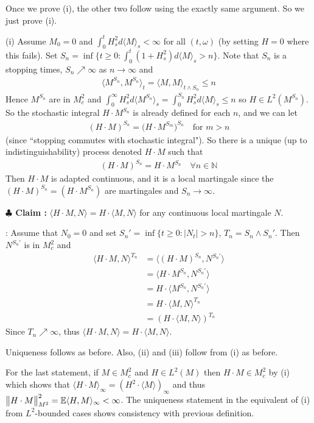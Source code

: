 \documentclass[12pt,a4paper]{article}
\newenvironment{proof}
{\begin{changemargin}{0.5cm}{0.5cm} 
	}%
	{\end{changemargin}
}
\newenvironment{subproof}
{\begin{changemargin}{0.5cm}{0.5cm} 
	}%
	{\end{changemargin}
}
\newenvironment{p}
{\begin{proof} 
	}%
	{\end{proof}
}
\begin{document}
\begin{p}
\pf Once we prove (i), the other two follow using the exactly same argument. So we just prove (i).

(i) Assume $M_0 =0$ and  $\int_0^t H_s^2 d\langle M \rangle_s < \infty$ for all $(t, \omega)$ (by setting $H=0$ where this fails). Set $S_n = \inf\{t\geq 0 : \int_0^t (1+H_s^2) d\langle M \rangle_s > n\}$. Note that $S_n$ is a stopping times, $S_n \nearrow \infty$ as $n\rightarrow \infty$ and
\begin{align*}
\langle M^{S_n}, M^{S_n} \rangle_t = \langle M, M \rangle_{t\wedge S_n} \leq n
\end{align*}
Hence $M^{S_n}$ are in $M^2_c$ and $\int_0^{\infty} H_s^2 d\langle M^{S_n} \rangle_s =\int_0^{S_n} H_s^2 d\langle M \rangle_s \leq n$ so $H\in L^2(M^{S_n})$. So the stochastic integral $H\cdot M^{S_n}$ is already defined for each $n$, and we can let
\begin{align*}
(H\cdot M)^{S_n} = \big( H \cdot M^{S_m} \big)^{S_n} \quad \text{for } m>n
\end{align*}
(since ``stopping commutes with stochastic integral"). So there is a unique (up to indistinguishability) process denoted $H\cdot M$ such that
\begin{align*}
(H\cdot M)^{S_n} = H \cdot M^{S_n} \quad \forall n\in \mathbb{N}
\end{align*}
Then $H\cdot M$ is adapted continuous, and it is a local martingale since the $(H\cdot M)^{S_n} = (H\cdot M^{S_n})$ are martingales and $S_n \rightarrow \infty$.

\textbf{$\clubsuit$ Claim :} $\langle H\cdot M , N \rangle = H \cdot \langle M, N \rangle$ for any continuous local martingale $N$.
\begin{subproof}
: Assume that $N_0 =0$ and set $S_n' = \inf \{t\geq 0 : |N_t| >n \}$, $T_n = S_n \wedge S_n'$. Then $N^{S_n'}$ is in $M_c^2$ and 
\begin{align*}
\langle H\cdot M, N \rangle^{T_n} &= \langle (H\cdot M)^{S_n}, N^{S_n'}\rangle \\
&=\langle H \cdot M^{S_n}, N^{S_n'} \rangle \\
&= H \cdot \langle M^{S_n} , N^{S_n'} \rangle \\
&= H\cdot \langle M, N \rangle^{T_n} \\
&= (H\cdot \langle M, N \rangle)^{T_n}
\end{align*}
Since $T_n \nearrow \infty$, thus $\langle H \cdot M, N \rangle = H \cdot \langle M, N \rangle$.
\end{subproof}
Uniqueness follows as before. Also, (ii) and (iii) follow from (i) as before.
\s

For the last statement, if $M\in M_c^2$ and $H\in L^2(M)$ then $H\cdot M \in M_c^2$ by (i) which shows that $\langle H\cdot M \rangle_{\infty} = (H^2 \cdot \langle M \rangle)_{\infty}$ and thus $\bigl\lVert H\cdot M\bigr\rVert_{M^2}^2 = \mathbb{E}\langle H, M \rangle_{\infty} < \infty$. The uniqueness statement in the equivalent of (i) from $L^2$-bounded cases shows consistency with previous definition.
\eop 
\end{p}
\end{document}
